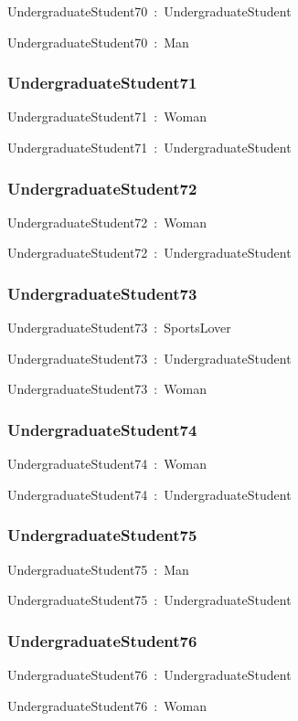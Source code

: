 \documentclass{article}
\begin{document}
UndergraduateStudent70~:~UndergraduateStudent

UndergraduateStudent70~:~Man

\subsubsection*{UndergraduateStudent71}

UndergraduateStudent71~:~Woman

UndergraduateStudent71~:~UndergraduateStudent

\subsubsection*{UndergraduateStudent72}

UndergraduateStudent72~:~Woman

UndergraduateStudent72~:~UndergraduateStudent

\subsubsection*{UndergraduateStudent73}

UndergraduateStudent73~:~SportsLover

UndergraduateStudent73~:~UndergraduateStudent

UndergraduateStudent73~:~Woman

\subsubsection*{UndergraduateStudent74}

UndergraduateStudent74~:~Woman

UndergraduateStudent74~:~UndergraduateStudent

\subsubsection*{UndergraduateStudent75}

UndergraduateStudent75~:~Man

UndergraduateStudent75~:~UndergraduateStudent

\subsubsection*{UndergraduateStudent76}

UndergraduateStudent76~:~UndergraduateStudent

UndergraduateStudent76~:~Woman
\end{document}
